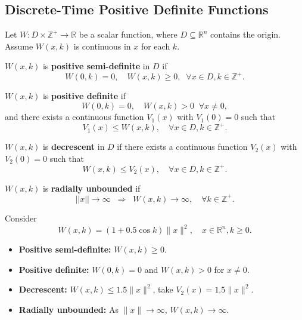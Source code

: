 \subsection{Discrete-Time Positive Definite Functions}
Let $W : D \times \mathbb{Z}^+ \to \mathbb{R}$ be a scalar function, where $D \subseteq \mathbb{R}^n$ contains the origin. Assume $W(x,k)$ is continuous in $x$ for each $k$.  

\begin{definition}
$W(x,k)$ is \textbf{positive semi-definite} in $D$ if
\[
W(0,k) = 0, \quad W(x,k) \ge 0, \;\; \forall x\in D, k \in \mathbb{Z}^+.
\]
\end{definition}

\begin{definition}
$W(x,k)$ is \textbf{positive definite} if
\[
W(0,k) = 0, \quad W(x,k) > 0 \;\; \forall x \neq 0,
\]
and there exists a continuous function $V_1(x)$ with $V_1(0)=0$ such that
\[
V_1(x) \leq W(x,k), \quad \forall x \in D, k \in \mathbb{Z}^+.
\]
\end{definition}

\begin{definition}
$W(x,k)$ is \textbf{decrescent} in $D$ if there exists a continuous function $V_2(x)$ with $V_2(0)=0$ such that
\[
W(x,k) \leq V_2(x), \quad \forall x \in D, k \in \mathbb{Z}^+.
\]
\end{definition}

\begin{definition}
$W(x,k)$ is \textbf{radially unbounded} if
\[
||x|| \to \infty \;\; \Rightarrow \;\; W(x,k) \to \infty, \quad \forall k \in \mathbb{Z}^+.
\]
\end{definition}

\begin{example}
Consider
\[
W(x,k) = (1+0.5\cos k)\|x\|^2, \quad x\in\mathbb{R}^n, k \ge 0.
\]

\begin{itemize}
    \item \textbf{Positive semi-definite:} $W(x,k) \ge 0$.  
    \item \textbf{Positive definite:} $W(0,k) = 0$ and $W(x,k) > 0$ for $x \neq 0$.  
    \item \textbf{Decrescent:} $W(x,k) \le 1.5\|x\|^2$, take $V_2(x)=1.5\|x\|^2$.  
    \item \textbf{Radially unbounded:} As $\|x\|\to \infty$, $W(x,k)\to\infty$.  
\end{itemize}
\end{example}

